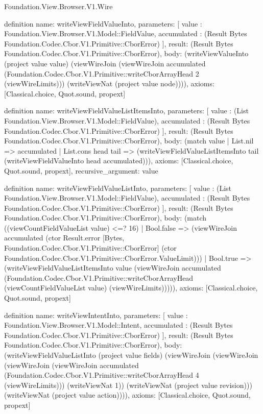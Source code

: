 \begin{lexlean}{Foundation.View.Browser.V1.Wire}
\begin{semanticmodule}
definition{
  name: writeViewFieldValueInto,
  parameters: [
    value : Foundation.View.Browser.V1.Model::FieldValue,
    accumulated : (Result Bytes Foundation.Codec.Cbor.V1.Primitive::CborError)
  ],
  result: (Result Bytes Foundation.Codec.Cbor.V1.Primitive::CborError),
  body: (writeViewValueInto (project value value) (viewWireJoin (viewWireJoin accumulated (Foundation.Codec.Cbor.V1.Primitive::writeCborArrayHead 2 (viewWireLimits))) (writeViewNat (project value node)))),
  axioms: [Classical.choice, Quot.sound, propext]
}

definition{
  name: writeViewFieldValueListItemsInto,
  parameters: [
    value : (List Foundation.View.Browser.V1.Model::FieldValue),
    accumulated : (Result Bytes Foundation.Codec.Cbor.V1.Primitive::CborError)
  ],
  result: (Result Bytes Foundation.Codec.Cbor.V1.Primitive::CborError),
  body: (match value
    | List.nil => accumulated
    | List.cons head tail => (writeViewFieldValueListItemsInto tail (writeViewFieldValueInto head accumulated))),
  axioms: [Classical.choice, Quot.sound, propext],
  recursive_argument: value
}

definition{
  name: writeViewFieldValueListInto,
  parameters: [
    value : (List Foundation.View.Browser.V1.Model::FieldValue),
    accumulated : (Result Bytes Foundation.Codec.Cbor.V1.Primitive::CborError)
  ],
  result: (Result Bytes Foundation.Codec.Cbor.V1.Primitive::CborError),
  body: (match ((viewCountFieldValueList value) <=? 16)
    | Bool.false => (viewWireJoin accumulated (ctor Result.error [Bytes, Foundation.Codec.Cbor.V1.Primitive::CborError] (ctor Foundation.Codec.Cbor.V1.Primitive::CborError.ValueLimit)))
    | Bool.true => (writeViewFieldValueListItemsInto value (viewWireJoin accumulated (Foundation.Codec.Cbor.V1.Primitive::writeCborArrayHead (viewCountFieldValueList value) (viewWireLimits))))),
  axioms: [Classical.choice, Quot.sound, propext]
}

definition{
  name: writeViewIntentInto,
  parameters: [
    value : Foundation.View.Browser.V1.Model::Intent,
    accumulated : (Result Bytes Foundation.Codec.Cbor.V1.Primitive::CborError)
  ],
  result: (Result Bytes Foundation.Codec.Cbor.V1.Primitive::CborError),
  body: (writeViewFieldValueListInto (project value fields) (viewWireJoin (viewWireJoin (viewWireJoin (viewWireJoin accumulated (Foundation.Codec.Cbor.V1.Primitive::writeCborArrayHead 4 (viewWireLimits))) (writeViewNat 1)) (writeViewNat (project value revision))) (writeViewNat (project value action)))),
  axioms: [Classical.choice, Quot.sound, propext]
}


\end{semanticmodule}
\end{lexlean}

